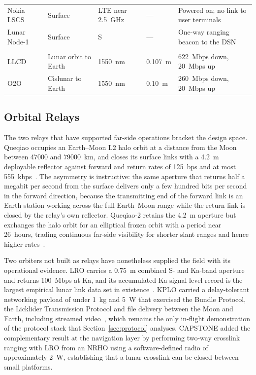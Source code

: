 \documentclass[11pt,a4paper]{article}
\begin{document}
\begin{table}[!t]
\begin{tabularx}{\textwidth}{@{}>{\raggedright\arraybackslash}p{2.7cm}>{\raggedright\arraybackslash}p{3.5cm}>{\raggedright\arraybackslash}p{3.4cm}>{\raggedright\arraybackslash}p{1.8cm}>{\raggedright\arraybackslash}X@{}}
Nokia LSCS~\cite{nokia_im2_outcome} & Surface & LTE near \SI{2.5}{GHz} & --- & Powered on; no link to user terminals \\
Lunar Node-1~\cite{nasa_ln1} & Surface & S & --- & One-way ranging beacon to the DSN \\
\addlinespace[2pt]
\multicolumn{5}{@{}l}{\emph{Optical terminals}}\\
LLCD~\cite{boroson_llcd} & Lunar orbit to Earth & \SI{1550}{nm} & \SI{0.107}{m} & \SI{622}{Mbps} down, \SI{20}{Mbps} up \\
O2O~\cite{nasa_o2o} & Cislunar to Earth & \SI{1550}{nm} & \SI{0.10}{m} & \SI{260}{Mbps} down, \SI{20}{Mbps} up \\
\bottomrule
\end{tabularx}
\end{table}

\subsection{Orbital Relays}
The two relays that have supported far-side operations bracket the design space. Queqiao occupies an Earth--Moon L2 halo orbit at a distance from the Moon between \SI{47000}{} and \SI{79000}{km}, and closes its surface links with a \SI{4.2}{m} deployable reflector against forward and return rates of \SI{125}{bps} and at most \SI{555}{kbps}~\cite{chen_ce4_relay}. The asymmetry is instructive: the same aperture that returns half a megabit per second from the surface delivers only a few hundred bits per second in the forward direction, because the transmitting end of the forward link is an Earth station working across the full Earth--Moon range while the return link is closed by the relay's own reflector. Queqiao-2 retains the \SI{4.2}{m} aperture but exchanges the halo orbit for an elliptical frozen orbit with a period near \SI{26}{hours}, trading continuous far-side visibility for shorter slant ranges and hence higher rates~\cite{cnsa_queqiao2}.

Two orbiters not built as relays have nonetheless supplied the field with its operational evidence. LRO carries a \SI{0.75}{m} combined S- and Ka-band aperture and returns \SI{100}{Mbps} at Ka, and its accumulated Ka signal-level record is the largest empirical lunar link data set in existence~\cite{lro_ka_analysis}. KPLO carried a delay-tolerant networking payload of under \SI{1}{kg} and \SI{5}{W} that exercised the Bundle Protocol, the Licklider Transmission Protocol and file delivery between the Moon and Earth, including streamed video~\cite{kim_kplo_dtn}, which remains the only in-flight demonstration of the protocol stack that Section~\ref{sec:protocol} analyses. CAPSTONE added the complementary result at the navigation layer by performing two-way crosslink ranging with LRO from an NRHO using a software-defined radio of approximately \SI{2}{W}, establishing that a lunar crosslink can be closed between small platforms.
\end{document}
